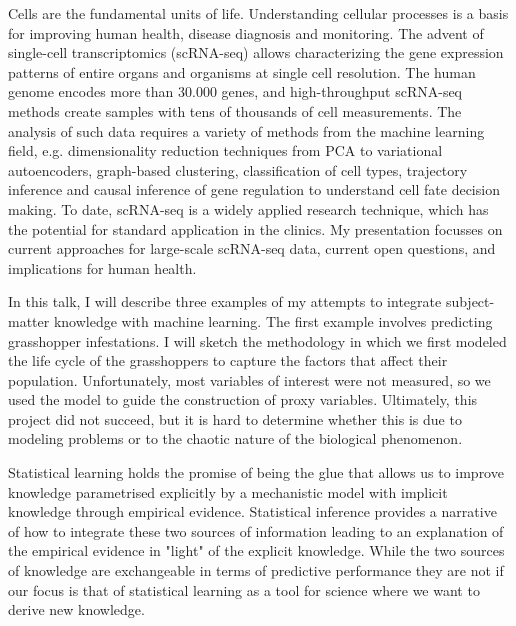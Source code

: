 \documentclass[a4paper,UKenglish]{dagrep-v2018}
\begin{document}
Cells are the fundamental units of life. Understanding cellular processes is a basis for improving human health, disease diagnosis and monitoring. The advent of single-cell transcriptomics (scRNA-seq) allows characterizing the gene expression patterns of entire organs and organisms at single cell resolution. The human genome encodes more than 30.000 genes, and high-throughput scRNA-seq methods create samples with tens of thousands of cell measurements. The analysis of such data requires a variety of methods from the machine learning field, e.g. dimensionality reduction techniques from PCA to variational autoencoders, graph-based clustering, classification of cell types, trajectory inference and causal inference of gene regulation to understand cell fate decision making. To date, scRNA-seq is a widely applied research technique, which has the potential for standard application in the clinics.  My presentation focusses on current approaches for large-scale scRNA-seq data, current open questions, and implications for human health.

\license

In this talk, I will describe three examples of my attempts to integrate subject-matter knowledge with machine learning. The first example involves predicting grasshopper infestations. I will sketch the methodology in which we first modeled the life cycle of the grasshoppers to capture the factors that affect their population. Unfortunately, most variables of interest were not measured, so we used the model to guide the construction of proxy variables. Ultimately, this project did not succeed, but it is hard to determine whether this is due to modeling problems or to the chaotic nature of the biological phenomenon.

\license

Statistical learning holds the promise of being the glue that allows us to improve knowledge parametrised explicitly by a mechanistic model with implicit knowledge through empirical evidence. Statistical inference provides a narrative of how to integrate these two sources of information leading to an explanation of the empirical evidence in "light" of the explicit knowledge. While the two sources of knowledge are exchangeable in terms of predictive performance they are not if our focus is that of statistical learning as a tool for science where we want to derive new knowledge.
\end{document}
